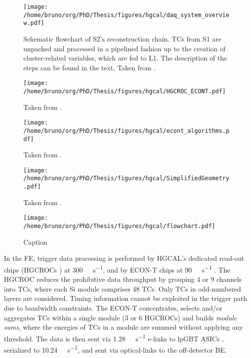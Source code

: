 \documentclass[11pt]{article}
\begin{document}
\begin{figure}
\begin{center}
\texttt{[image: /home/bruno/org/PhD/Thesis/figures/hgcal/daq\_system\_overview.pdf]}
\end{center}
\caption{\label{fig:daq_system_overview}Schematic flowchart of S2’s reconstruction chain. TCs from S1 are unpacked and processed in a pipelined fashion up to the creation of cluster-related variables, which are fed to L1. The description of the steps can be found in the text. Taken from \cite{bruno_chep23}.}
\end{figure}

\begin{figure}
\texttt{[image: /home/bruno/org/PhD/Thesis/figures/hgcal/HGCROC\_ECONT.pdf]}
\caption{\label{fig:hgcroc_econt}Taken from \cite{bruno_chep23}.}
\end{figure}

\begin{figure}
\texttt{[image: /home/bruno/org/PhD/Thesis/figures/hgcal/econt\_algorithms.pdf]}
\caption{\label{fig:econt_algorithms}Taken from \cite{bruno_chep23}.}
\end{figure}

\begin{figure}
\texttt{[image: /home/bruno/org/PhD/Thesis/figures/hgcal/SimplifiedGeometry.pdf]}
\caption{\label{fig:econt_algorithms}Taken from \cite{bruno_chep23}.}
\end{figure}

\begin{figure}
\texttt{[image: /home/bruno/org/PhD/Thesis/figures/hgcal/flowchart.pdf]}
\caption{\label{fig:econt_algorithms}Caption}
\end{figure}

In the \ac{FE}, trigger data processing is performed by \ac{HGCAL}'s dedicated read-out chips (\acp{HGCROC} \cite{hgcroc}) at \SI{300}{\tera\byte\per\second}, and by \ac{ECON-T} chips at \SI{90}{\tera\byte\per\second} \cite{econ,hgcalTDR}.
The \ac{HGCROC} reduces the prohibitive data throughput by grouping 4 or 9 channels into \acp{TC}, where each \ac{Si} module comprises 48 \acp{TC}.
Only \acp{TC} in odd-numbered layers are considered.
Timing information cannot be exploited in the trigger path due to bandwidth constraints.
The ECON-T concentrates, selects and/or aggregates TCs within a single module (3 or 6 \acp{HGCROC}) and builds \textit{module sums}, where the energies of TCs in a module are summed without applying any threshold.
The data is then sent via \SI{1.28}{\giga\bit\per\second} e-links to lpGBT ASICs \cite{lpgbt}, serialized to \SI{10.24}{\giga\bit\per\second}, and sent via optical-links \cite{vtrxp} to the off-detector \ac{BE}.
\end{document}
